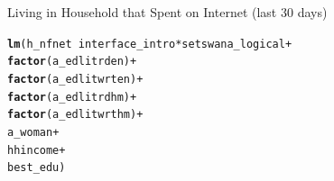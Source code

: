 \documentclass[a4paper,british]{article}\usepackage[]{graphicx}\usepackage[]{color}
\makeatletter
\newcommand{\hlopt}[1]{\textcolor[rgb]{0,0,0}{#1}}%
\newcommand{\hlstd}[1]{\textcolor[rgb]{0.345,0.345,0.345}{#1}}%
\newcommand{\hlkwd}[1]{\textcolor[rgb]{0.737,0.353,0.396}{\textbf{#1}}}%
\newenvironment{kframe}{%
 \def\at@end@of@kframe{}%
 \ifinner\ifhmode%
  \def\at@end@of@kframe{\end{minipage}}%
  \begin{minipage}{\columnwidth}%
 \fi\fi%
 \def\FrameCommand##1{\hskip\@totalleftmargin \hskip-\fboxsep
 \colorbox{shadecolor}{##1}\hskip-\fboxsep
     \hskip-\linewidth \hskip-\@totalleftmargin \hskip\columnwidth}%
 \MakeFramed {\advance\hsize-\width
   \@totalleftmargin\z@ \linewidth\hsize
   \@setminipage}}%
 {\par\unskip\endMakeFramed%
 \at@end@of@kframe}
\newenvironment{knitrout}{}{} %
\makeatother
\begin{document}
\begin{table}[H]
\caption{Living in Household that Spent on Internet (last 30 days)}
\label{tab:nfnet}

\begin{knitrout}
\color{fgcolor}\begin{kframe}
\begin{alltt}
\hlkwd{lm}\hlstd{(h_nfnet} \hlopt{~}  \hlstd{interface_intro}\hlopt{*}\hlstd{setswana_logical} \hlopt{+}
              \hlkwd{factor}\hlstd{(a_edlitrden)}                       \hlopt{+}
              \hlkwd{factor}\hlstd{(a_edlitwrten)}                      \hlopt{+}
              \hlkwd{factor}\hlstd{(a_edlitrdhm)}                       \hlopt{+}
              \hlkwd{factor}\hlstd{(a_edlitwrthm)}                      \hlopt{+}
              \hlstd{a_woman}                                   \hlopt{+}
              \hlstd{hhincome}                                  \hlopt{+}
              \hlstd{best_edu)}
\end{alltt}
\end{kframe}



\end{knitrout}
\end{table}
\end{document}
